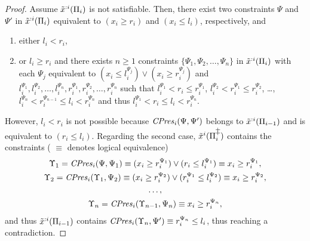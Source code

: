 \begin{proof}
    Assume $\tilde{x}^{:i}(\Pi_i)$ is not satisfiable. Then, there exist 
two constraints $\Psi$ and $\Psi'$ in $\tilde{x}^{:i}(\Pi_i)$ equivalent to $(x_i \ge r_i)$ and $(x_i \le l_i)$, respectively, and 
    \begin{enumerate}
        \item either $l_i < r_i$, 
        \item or $l_i \ge r_i$ and there exists $n \ge 1$ constraints $\{\Psi_1,\Psi_2,\ldots,\Psi_n\}$ in $\tilde{x}^{:i}(\Pi_i)$ with each $\Psi_j$ equivalent to
        $(x_i \le l^{\Psi_j}_i) \vee (x_i \ge r^{\Psi_j}_i)$ and $l^{\Psi_1}_i,l^{\Psi_2}_i,\ldots,l^{\Psi_n}_i, r^{\Psi_1}_i, r^{\Psi_2}_i,\ldots,r^{\Psi_n}_i$ 
        such that $l^{\Psi_1}_i < r_i \le r^{\Psi_1}_i$, $l^{\Psi_2}_i < r^{\Psi_1}_i \le r^{\Psi_2}_i$, \ldots, $l^{\Psi_n}_i < r^{\Psi_{n-1}}_i \le l_i < r^{\Psi_n}_i$ and thus $l^{\Psi_1}_i < r_i \le l_i < r^{\Psi_n}_i$. 
    \end{enumerate}
    However, $l_i < r_i$ is not possible because $\mathit{CPres}_i(\Psi,\Psi')$ belongs to $\tilde{x}^{:i}(\Pi_{i-1})$
    and is equivalent to $(r_i \le l_i)$. 
    Regarding the second case, 
    $\sample^i(\Pi_i^\plusplus)$ contains the constraints ( $\equiv$ denotes logical equivalence)
    \begin{gather*}
    \Upsilon_1 = \mathit{CPres}_i(\Psi,\Psi_1) \equiv (x_i \ge r^{\Psi_1}_i) \vee (r_i \le l_i^{\Psi_1})  \equiv  x_i \ge r^{\Psi_1}_i,\\
    \Upsilon_2 = \mathit{CPres}_i(\Upsilon_1,\Psi_2) \equiv (x_i \ge r^{\Psi_2}_i) \vee (r_i^{\Psi_1} \le l_i^{\Psi_2}) \equiv x_i \ge r^{\Psi_2}_i, \\
    \ldots, \\
    \Upsilon_n = \mathit{CPres}_i(\Upsilon_{n-1},\Psi_n)  \equiv x_i \ge r^{\Psi_n}_i,
    \end{gather*}
    and thus $\tilde{x}^{:i}(\Pi_{i-1})$ contains  $\mathit{CPres}_i(\Upsilon_{n},\Psi') \equiv r^{\Psi_n}_i \le l_i$, thus reaching a contradiction.
\end{proof}
